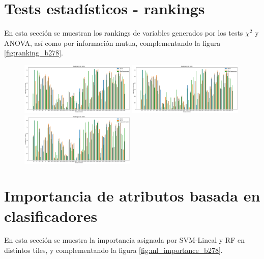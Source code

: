 \begin{appendix}
\newpage

\section{Tests estadísticos - rankings}
\label{anexo_b_rankings}
 En esta sección se muestran los rankings de variables generados por los tests $\chi^2$ y ANOVA, así como por información mutua, complementando la figura \ref{fig:ranking_b278}.
 
\begin{figure}[h!]
\centering
  \includegraphics[width=0.49\textwidth]{Kap6/test=b234_variable_importance_ranking.png} 
  \includegraphics[width=0.49\textwidth]{Kap6/test=b261_variable_importance_ranking.png}  \\
  \includegraphics[width=0.49\textwidth]{Kap6/test=b360_variable_importance_ranking.png} 
\end{figure}

\section{Importancia de atributos basada en clasificadores}
\label{anexo_ml_scores}
 En esta sección se muestra la importancia asignada por SVM-Lineal y RF en distintos tiles, y complementando la figura \ref{fig:ml_importance_b278}.
 

\end{appendix}
